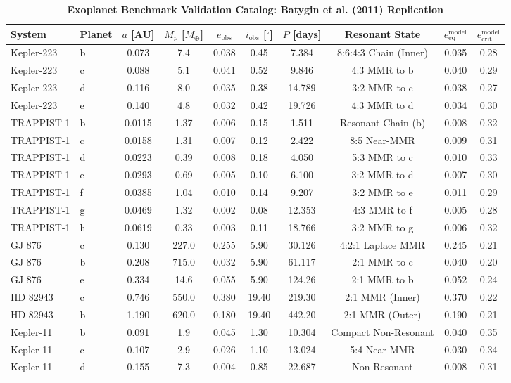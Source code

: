 \documentclass[11pt,a4paper]{article}
\begin{document}
\begin{table}[H]
\centering
\small
\setlength{\tabcolsep}{4.5pt}
\caption{\textbf{Exoplanet Benchmark Validation Catalog: Batygin et al. (2011) Replication}}
\label{tab:benchmarks}
\begin{tabular}{llcccccccc}
\toprule
\textbf{System} & \textbf{Planet} & $a$ [AU] & $M_p$ [$M_\oplus$] & $e_{\text{obs}}$ & $i_{\text{obs}}$ [$^\circ$] & $P$ [days] & \textbf{Resonant State} & $e_{\text{eq}}^{\text{model}}$ & $e_{\text{crit}}^{\text{model}}$ \\
\midrule
Kepler-223 & b & 0.073 & 7.4 & 0.038 & 0.45 & 7.384 & 8:6:4:3 Chain (Inner) & 0.035 & 0.28 \\
Kepler-223 & c & 0.088 & 5.1 & 0.041 & 0.52 & 9.846 & 4:3 MMR to b & 0.040 & 0.29 \\
Kepler-223 & d & 0.116 & 8.0 & 0.035 & 0.38 & 14.789 & 3:2 MMR to c & 0.038 & 0.27 \\
Kepler-223 & e & 0.140 & 4.8 & 0.032 & 0.42 & 19.726 & 4:3 MMR to d & 0.034 & 0.30 \\
\midrule
TRAPPIST-1 & b & 0.0115 & 1.37 & 0.006 & 0.15 & 1.511 & Resonant Chain (b) & 0.008 & 0.32 \\
TRAPPIST-1 & c & 0.0158 & 1.31 & 0.007 & 0.12 & 2.422 & 8:5 Near-MMR & 0.009 & 0.31 \\
TRAPPIST-1 & d & 0.0223 & 0.39 & 0.008 & 0.18 & 4.050 & 5:3 MMR to c & 0.010 & 0.33 \\
TRAPPIST-1 & e & 0.0293 & 0.69 & 0.005 & 0.10 & 6.100 & 3:2 MMR to d & 0.007 & 0.30 \\
TRAPPIST-1 & f & 0.0385 & 1.04 & 0.010 & 0.14 & 9.207 & 3:2 MMR to e & 0.011 & 0.29 \\
TRAPPIST-1 & g & 0.0469 & 1.32 & 0.002 & 0.08 & 12.353 & 4:3 MMR to f & 0.005 & 0.28 \\
TRAPPIST-1 & h & 0.0619 & 0.33 & 0.003 & 0.11 & 18.766 & 3:2 MMR to g & 0.006 & 0.32 \\
\midrule
GJ 876 & c & 0.130 & 227.0 & 0.255 & 5.90 & 30.126 & 4:2:1 Laplace MMR & 0.245 & 0.21 \\
GJ 876 & b & 0.208 & 715.0 & 0.032 & 5.90 & 61.117 & 2:1 MMR to c & 0.040 & 0.20 \\
GJ 876 & e & 0.334 & 14.6 & 0.055 & 5.90 & 124.26 & 2:1 MMR to b & 0.052 & 0.24 \\
\midrule
HD 82943 & c & 0.746 & 550.0 & 0.380 & 19.40 & 219.30 & 2:1 MMR (Inner) & 0.370 & 0.22 \\
HD 82943 & b & 1.190 & 620.0 & 0.180 & 19.40 & 442.20 & 2:1 MMR (Outer) & 0.190 & 0.21 \\
\midrule
Kepler-11 & b & 0.091 & 1.9 & 0.045 & 1.30 & 10.304 & Compact Non-Resonant & 0.040 & 0.35 \\
Kepler-11 & c & 0.107 & 2.9 & 0.026 & 1.10 & 13.024 & 5:4 Near-MMR & 0.030 & 0.34 \\
Kepler-11 & d & 0.155 & 7.3 & 0.004 & 0.85 & 22.687 & Non-Resonant & 0.008 & 0.31 \\
\bottomrule
\end{tabular}
\end{table}
\end{document}
